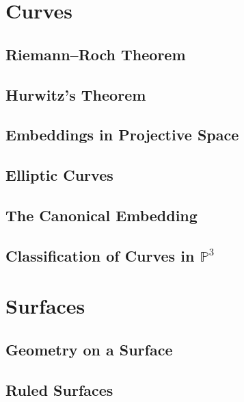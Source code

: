 \documentclass[11pt, a4paper]{article}
\begin{document}
\section{Curves}

\subsection{Riemann--Roch Theorem}

\subsection{Hurwitz's Theorem}

\subsection{Embeddings in Projective Space}

\subsection{Elliptic Curves}

\subsection{The Canonical Embedding}

\subsection{Classification of Curves in $\mathbb{P}^3$}

\section{Surfaces}

\subsection{Geometry on a Surface}

\subsection{Ruled Surfaces}
\end{document}
